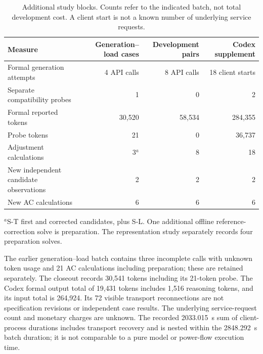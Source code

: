 \begin{table}[htbp]
\caption{Additional study blocks. Counts refer to the indicated batch, not total development cost. A client start is not a known number of underlying service requests.}
\label{tab:additional-costs}
\small
\begin{tabularx}{\linewidth}{@{}Xrrr@{}}
\toprule
Measure & Generation--load cases & Development pairs & Codex supplement \\
\midrule
Formal generation attempts & 4 API calls & 8 API calls & 18 client starts \\
Separate compatibility probes & 1 & 0 & 2 \\
Formal reported tokens & 30,520 & 58,534 & 284,355 \\
Probe tokens & 21 & 0 & 36,737 \\
Adjustment calculations & 3$^{a}$ & 8 & 18 \\
New independent candidate observations & 2 & 2 & 2 \\
New AC calculations & 6 & 6 & 6 \\
\bottomrule
\end{tabularx}
\par\smallskip\footnotesize $^{a}$S-T first and corrected candidates, plus S-L. One additional offline reference-correction solve is preparation. The representation study separately records four preparation solves.
\end{table}

The earlier generation--load batch contains three incomplete calls with unknown token usage and 21 AC calculations including preparation; these are retained separately. The closeout records 30,541 tokens including its 21-token probe. The Codex formal output total of 19,431 tokens includes 1,516 reasoning tokens, and its input total is 264,924. Its 72 visible transport reconnections are not specification revisions or independent case results. The underlying service-request count and monetary charges are unknown. The recorded 2033.015~s sum of client-process durations includes transport recovery and is nested within the 2848.292~s batch duration; it is not comparable to a pure model or power-flow execution time.


\FloatBarrier
